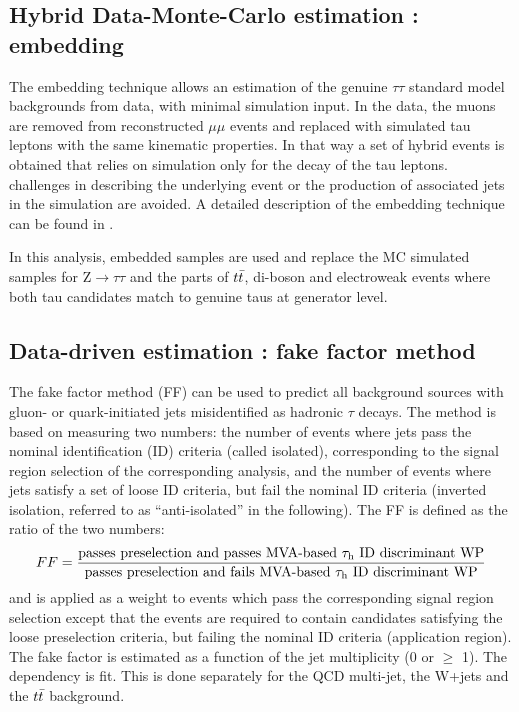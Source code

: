 \subsection{Hybrid Data-Monte-Carlo estimation : embedding}

The embedding technique allows an estimation of the genuine $\tau\tau$ standard model backgrounds from data, with minimal simulation input. In the data, the muons are removed from reconstructed $\mu\mu$ events and replaced with simulated tau leptons with the same kinematic properties. In that way a set of hybrid events is obtained that relies on simulation only for the decay of the tau leptons. challenges in describing the underlying event or the production of associated jets in the simulation are avoided. A detailed description of the embedding technique can be found in \cite{CMS:2018apv}.

In this analysis, embedded samples are used and replace the MC simulated samples for $\mathrm{Z}\rightarrow \tau\tau$ and the parts of $t\Bar{t}$, di-boson and electroweak events where both tau candidates match to genuine taus at generator level.

\subsection{Data-driven estimation : fake factor method}

The fake factor method (FF) can be used to predict all background sources with gluon- or quark-initiated jets misidentified as hadronic $\tau$ decays. The method is based on measuring two numbers: the number of events where jets pass the nominal \tauh identification (ID) criteria (called isolated), corresponding to the signal region selection of the corresponding analysis, and the number of events where jets satisfy a set of loose ID criteria, but fail the nominal \tauh ID criteria (inverted isolation, referred to as “anti-isolated” in the following). The FF is defined as the ratio of the two numbers:
\begin{equation}
    FF = \frac{\text{passes preselection and passes MVA-based \tauh ID discriminant WP}}{\text{passes preselection and fails MVA-based \tauh ID discriminant WP}}
\end{equation}
and is applied as a weight to events which pass the corresponding signal region selection except that the events are required to contain \tauh candidates satisfying the loose preselection criteria, but failing the nominal \tauh ID criteria (application region). The fake factor is estimated as a function of the jet multiplicity (0 or $\geq$ 1). The \pt dependency is fit. This is done separately for the QCD multi-jet, the W+jets and the $t\Bar{t}$ background.

